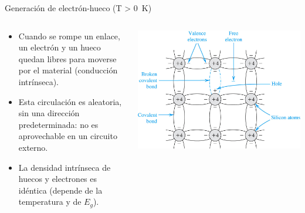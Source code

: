 \documentclass[xcolor={usenames,svgnames,dvipsnames}]{beamer}
\begin{document}
\begin{frame}[plain,label={sec:org2dabdfa}]{Generación de electrón-hueco (T > \SI{0}{\kelvin})}
\begin{columns}
\begin{column}{0.7\columnwidth}
\begin{itemize}[<+->]
\item Cuando se \alert{rompe un enlace}, un electrón y un hueco quedan libres para moverse por el material (conducción intrínseca).

\item Esta \alert{circulación es aleatoria}, sin una dirección predeterminada: \alert{no es aprovechable} en un circuito externo.

\item La \alert{densidad intrínseca de huecos y electrones es idéntica} (depende de la temperatura y de \(E_{g}\)).
\end{itemize}
\end{column}
\begin{column}{0.6\columnwidth}
\begin{center}
\includegraphics[width=.9\linewidth]{../figs/silicio_T300K.jpg}
\end{center}
\end{column}
\end{columns}
\end{frame}
\end{document}
